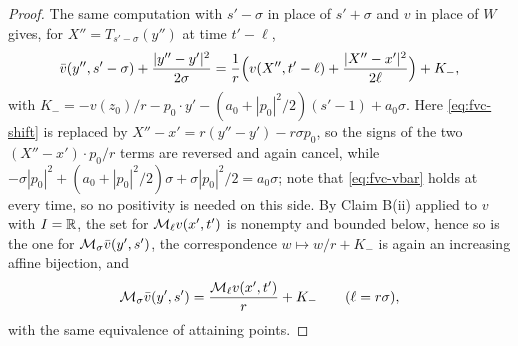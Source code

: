 \begin{proof}
The same computation with $s'-\sigma$ in place of $s'+\sigma$ and $v$ in place
of $W$ gives, for $X''=T_{s'-\sigma}(y'')$ at time $t'-\ell$,
\begin{equation}\label{eq:fvc-bwd-term}
  \bar v(y'',s'-\sigma)+\frac{|y''-y'|^2}{2\sigma}
   =\frac1r\Bigl(v(X'',t'-\ell)+\frac{|X''-x'|^2}{2\ell}\Bigr)+K_-,
\end{equation}
with $K_-=-v(z_0)/r-p_0\cdot y'-(a_0+|p_0|^2/2)(s'-1)+a_0\sigma$. Here
\eqref{eq:fvc-shift} is replaced by $X''-x'=r(y''-y')-r\sigma p_0$, so the
signs of the two $(X''-x')\cdot p_0/r$ terms are reversed and again cancel,
while
$-\sigma|p_0|^2+(a_0+|p_0|^2/2)\sigma+\sigma|p_0|^2/2=a_0\sigma$; note that
\eqref{eq:fvc-vbar} holds at every time, so no positivity is needed on this
side. By Claim B(ii) applied to $v$ with $I=\mathbb{R}$, the set for
$\mathcal{M}_\ell v(x',t')$ is nonempty and bounded below, hence so is the one for
$\mathcal{M}_\sigma\bar v(y',s')$, the correspondence $w\mapsto w/r+K_-$ is again an
increasing affine bijection, and
\begin{equation}\label{eq:fvc-bwd}
  \mathcal{M}_\sigma\bar v(y',s')=\frac{\mathcal{M}_\ell v(x',t')}{r}+K_-
  \qquad(\ell=r\sigma),
\end{equation}
with the same equivalence of attaining points.


\end{proof}
